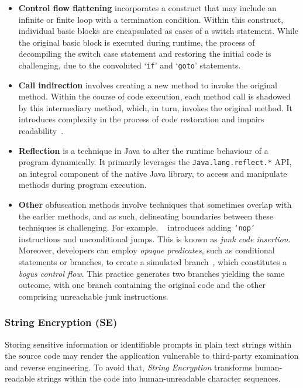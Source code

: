 \begin{itemize}
    \item \textbf{Control flow flattening} incorporates a construct that may include an infinite or finite loop with a termination condition. Within this construct, individual basic blocks are encapsulated as cases of a switch statement. While the original basic block is executed during runtime, the process of decompiling the switch case statement and restoring the initial code is challenging, due to the convoluted `\texttt{if}' and `\texttt{goto}' statements.
    
    \item \textbf{Call indirection} involves creating a new method to invoke the original method. Within the course of code execution, each method call is shadowed by this intermediary method, which, in turn, invokes the original method. It introduces complexity in the process of code restoration and impairs readability~\cite{zhang2021android,bacci2018a}. 
    
    \item \textbf{Reflection} is a technique in Java to alter the runtime behaviour of a program dynamically. It primarily leverages the \texttt{Java.lang.reflect.*} API, an integral component of the native Java library, to access and manipulate methods during program execution. 
    
    \item \textbf{Other} obfuscation methods involve techniques that sometimes overlap with the earlier methods, and as such, delineating boundaries between these techniques is challenging. For example, ~\cite{li2019obfusifier} introduces adding \texttt{`nop'} instructions and unconditional jumps. This is known as \textit{junk code insertion}. Moreover, developers can employ \textit{opaque predicates}, such as conditional statements or branches, to create a simulated branch~\cite{guo2022survey}, which constitutes a \textit{bogus control flow}. This practice generates two branches yielding the same outcome, with one branch containing the original code and the other comprising unreachable junk instructions. 
\end{itemize}
  
\subsubsection{String Encryption (SE)} Storing sensitive information or identifiable prompts in plain text strings within the source code may render the application vulnerable to third-party examination and reverse engineering. To avoid that, \textit{String Encryption} transforms human-readable strings within the code into human-unreadable character sequences. 


